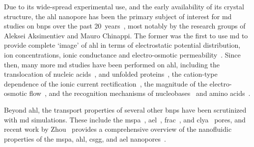 Due to its wide-spread experimental use, and the early availability of its crystal structure, the \gls{ahl}
nanopore has been the primary subject of interest for \gls{md} studies on \glspl{bnp} over the past
20~years~\cite{Aksimentiev-2005,DeBiase-2016,Basdevant-2019}, most notably by the research groups of Aleksei
Aksimentiev and Mauro Chinappi. The former was the first to use \gls{md} to provide complete `image' of
\gls{ahl} in terms of electrostatic potential distribution, ion concentrations, ionic conductance and
electro-osmotic permeability~\cite{Aksimentiev-2005}. Since then, many more \gls{md} studies have been
performed on \gls{ahl}, including the translocation of nucleic acids~\cite{Wells-2007}, and unfolded
proteins~\cite{DiMarino-2015}, the cation-type dependence of the ionic current
rectification~\cite{Bhattacharya-2011}, the magnitude of the electro-osmotic flow~\cite{Bonome-2017}, and the
recognition mechanisms of nucleobases~\cite{Manara-2015b,DeBiase-2016} and amino acids~\cite{DiMuccio-2019}.

Beyond \gls{ahl}, the transport properties of several other \glspl{bnp} have been scrutinized with \gls{md}
simulations. These include the \gls{mspa}~\cite{Bhattacharya-2012,Manara-2015,Bhattacharya-2016,Zhou-2020},
\gls{ael}~\cite{Cao-2018,Ouldali-2020,Zhou-2020}, \gls{frac}~\cite{Zhao-2019}, and
\gls{clya}~\cite{Mandal-2016,Wilson-2019,Li-2020} pores, and recent work by Zhou~\etal{} provides a
comprehensive overview of the nanofluidic properties of the \gls{mspa}, \gls{ahl}, \gls{csgg}, and \gls{ael}
nanopores~\cite{Zhou-2020}.



